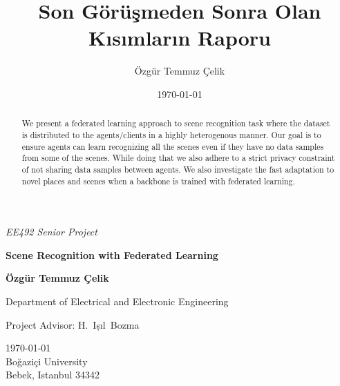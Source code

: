 \documentclass[11pt]{article}
\title{ Son Görüşmeden Sonra Olan Kısımların Raporu}
\author{ Özgür Temmuz Çelik }
\date{\today}
\begin{document}
\pagebreak

\centerline{\large \textsl{ EE492 Senior Project} }
\vskip 5mm

\vspace*{3cm}
\centerline{\Large \bf  Scene Recognition with Federated Learning }
\vskip 2cm

\centerline{\large\bf  Özgür Temmuz Çelik} 

\vspace*{2cm}
\begin{center}
{\large\rm  Department of Electrical and Electronic Engineering}
\end{center}

\vskip 2cm
\begin{center}
{\large\rm  Project Advisor:  H.~I\d{s}{\i}l~Bozma}
\end{center}  

\vspace*{2cm}
\begin{center}
\today \\[2cm]
{Bo\u{g}azi\c{c}i University}\\[5mm]
{\large\rm      Bebek, Istanbul 34342} \\
\end{center}

\newpage

\begin{abstract}

\par We present a federated learning approach to scene recognition task where the dataset is distributed to the agents/clients in a highly heterogenous manner. Our goal is to ensure agents can learn recognizing all the scenes even if they have no data samples from some of the scenes. While doing that we also adhere to a strict privacy constraint of not sharing data samples between agents. We also investigate the fast adaptation to novel places and scenes when a backbone is trained with federated learning.

\end{abstract}

\newpage

\tableofcontents
\pagebreak



\listoffigures
\pagebreak
\end{document}
